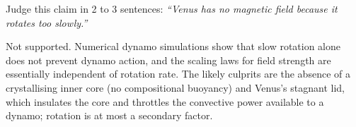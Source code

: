 \parti Judge this claim in 2 to 3 sentences:
\emph{``Venus has no magnetic field because it rotates too slowly.''}

\begin{solution}
Not supported. Numerical dynamo simulations show that slow rotation alone does not prevent
dynamo action, and the scaling laws for field strength are essentially independent of
rotation rate. The likely culprits are the absence of a crystallising inner core (no
compositional buoyancy) and Venus's stagnant lid, which insulates the core and throttles the
convective power available to a dynamo; rotation is at most a secondary factor.
\end{solution}
